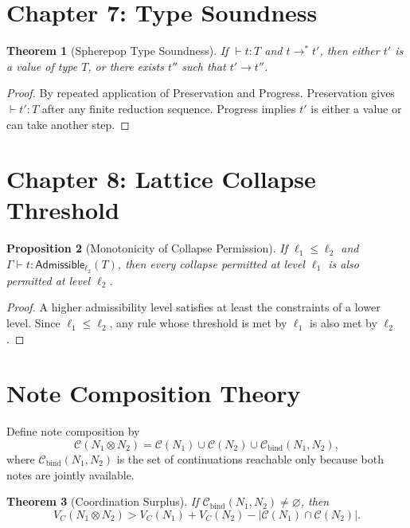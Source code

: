 \documentclass[12pt, a4paper, openany]{book}
\theoremstyle{plain}
\newtheorem{theorem}{Theorem}[chapter]
\newtheorem{proposition}[theorem]{Proposition}
\theoremstyle{definition}
\theoremstyle{remark}
\newcommand{\calC}{\mathcal{C}}
\newcommand{\Adm}{\mathsf{Admissible}}
\begin{document}
\section{Chapter 7: Type Soundness}

\begin{theorem}[Spherepop Type Soundness]
If $\vdash t : T$ and $t \to^* t'$, then either $t'$ is a value of type $T$,
or there exists $t''$ such that $t' \to t''$.
\end{theorem}

\begin{proof}
By repeated application of Preservation and Progress. Preservation gives
$\vdash t' : T$ after any finite reduction sequence. Progress implies $t'$ is
either a value or can take another step.
\end{proof}

\section{Chapter 8: Lattice Collapse Threshold}

\begin{proposition}[Monotonicity of Collapse Permission]
If $\ell_1 \leq \ell_2$ and $\Gamma \vdash t : \Adm_{\ell_2}(T)$, then every
collapse permitted at level $\ell_1$ is also permitted at level $\ell_2$.
\end{proposition}

\begin{proof}
A higher admissibility level satisfies at least the constraints of a lower level.
Since $\ell_1 \leq \ell_2$, any rule whose threshold is met by $\ell_1$ is also
met by $\ell_2$.
\end{proof}

\section{Note Composition Theory}

Define note composition by
\[
\calC(N_1 \otimes N_2) = \calC(N_1) \cup \calC(N_2) \cup \calC_{\mathrm{bind}}(N_1, N_2),
\]
where $\calC_{\mathrm{bind}}(N_1, N_2)$ is the set of continuations reachable
only because both notes are jointly available.

\begin{theorem}[Coordination Surplus]
If $\calC_{\mathrm{bind}}(N_1, N_2) \neq \varnothing$, then
\[
V_C(N_1 \otimes N_2) > V_C(N_1) + V_C(N_2) - |\calC(N_1) \cap \calC(N_2)|.
\]
\end{theorem}
\end{document}
